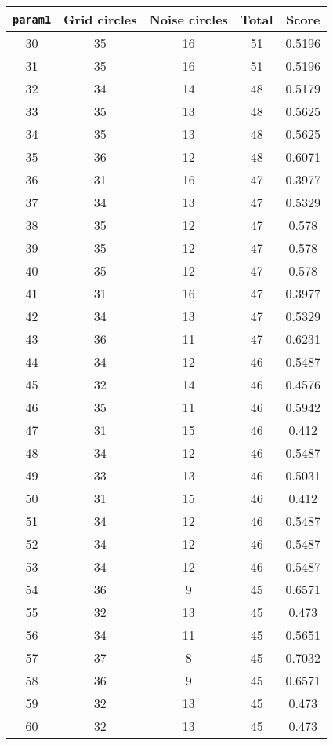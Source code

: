 \documentclass[letterpaper, 12pt]{article}
\begin{document}
\begin{longtable}{|c|c|c|c|c|}
\hline
\textbf{\texttt{param1}} & \textbf{Grid circles} & \textbf{Noise circles} & \textbf{Total} & \textbf{Score} \\
\hline
30 & 35 & 16 & 51 & 0.5196 \\
\hline
31 & 35 & 16 & 51 & 0.5196 \\
\hline
32 & 34 & 14 & 48 & 0.5179 \\
\hline
33 & 35 & 13 & 48 & 0.5625 \\
\hline
34 & 35 & 13 & 48 & 0.5625 \\
\hline
35 & 36 & 12 & 48 & 0.6071 \\
\hline
36 & 31 & 16 & 47 & 0.3977 \\
\hline
37 & 34 & 13 & 47 & 0.5329 \\
\hline
38 & 35 & 12 & 47 & 0.578 \\
\hline
39 & 35 & 12 & 47 & 0.578 \\
\hline
40 & 35 & 12 & 47 & 0.578 \\
\hline
41 & 31 & 16 & 47 & 0.3977 \\
\hline
42 & 34 & 13 & 47 & 0.5329 \\
\hline
43 & 36 & 11 & 47 & 0.6231 \\
\hline
44 & 34 & 12 & 46 & 0.5487 \\
\hline
45 & 32 & 14 & 46 & 0.4576 \\
\hline
46 & 35 & 11 & 46 & 0.5942 \\
\hline
47 & 31 & 15 & 46 & 0.412 \\
\hline
48 & 34 & 12 & 46 & 0.5487 \\
\hline
49 & 33 & 13 & 46 & 0.5031 \\
\hline
50 & 31 & 15 & 46 & 0.412 \\
\hline
51 & 34 & 12 & 46 & 0.5487 \\
\hline
52 & 34 & 12 & 46 & 0.5487 \\
\hline
53 & 34 & 12 & 46 & 0.5487 \\
\hline
54 & 36 & 9 & 45 & 0.6571 \\
\hline
55 & 32 & 13 & 45 & 0.473 \\
\hline
56 & 34 & 11 & 45 & 0.5651 \\
\hline
57 & 37 & 8 & 45 & 0.7032 \\
\hline
58 & 36 & 9 & 45 & 0.6571 \\
\hline
59 & 32 & 13 & 45 & 0.473 \\
\hline
60 & 32 & 13 & 45 & 0.473 \\

\end{longtable}
\end{document}
